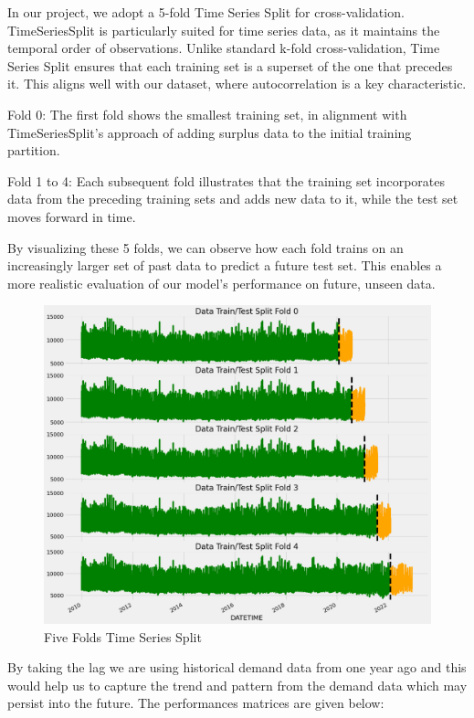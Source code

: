 \documentclass[mstat,12pt]{unswthesis}
\begin{document}
In our project, we adopt a 5-fold Time Series Split for
cross-validation. TimeSeriesSplit is particularly suited for time series
data, as it maintains the temporal order of observations. Unlike
standard k-fold cross-validation, Time Series Split ensures that each
training set is a superset of the one that precedes it. This aligns well
with our dataset, where autocorrelation is a key characteristic.

Fold 0: The first fold shows the smallest training set, in alignment
with TimeSeriesSplit's approach of adding surplus data to the initial
training partition.

Fold 1 to 4: Each subsequent fold illustrates that the training set
incorporates data from the preceding training sets and adds new data to
it, while the test set moves forward in time.

By visualizing these 5 folds, we can observe how each fold trains on an
increasingly larger set of past data to predict a future test set. This
enables a more realistic evaluation of our model's performance on
future, unseen data.

\begin{figure}[H]
\includegraphics[width=1\linewidth,]{images/5folds TimeSeriesSplit} \caption{Five Folds Time Series Split}\label{fig:five-fold-img}
\end{figure}

By taking the lag we are using historical demand data from one year ago
and this would help us to capture the trend and pattern from the demand
data which may persist into the future. The performances matrices are
given below:
\end{document}
